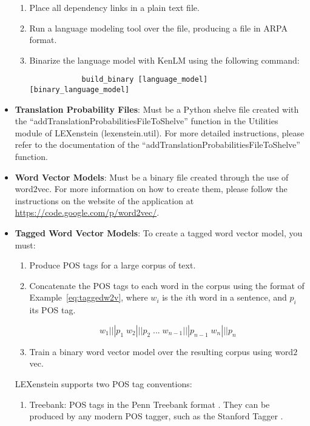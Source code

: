 \begin{itemize}
\begin{enumerate}
			\item Place all dependency links in a plain text file.
			\item Run a language modeling tool over the file, producing a file in ARPA format.
			\item Binarize the language model with KenLM using the following command:
			
			\begin{lstlisting}
			build_binary [language_model] [binary_language_model]
			\end{lstlisting}
		\end{enumerate}
			
	\item \textbf{Translation Probability Files}: Must be a Python shelve file created with the ``addTranslationProbabilitiesFileToShelve'' function in the Utilities module of LEXenstein (lexenstein.util). For more detailed instructions, please refer to the documentation of the ``addTranslationProbabilitiesFileToShelve'' function.
	
	\item \textbf{Word Vector Models}: Must be a binary file created through the use of word$2$vec. For more information on how to create them, please follow the instructions on the website of the application at \url{https://code.google.com/p/word2vec/}.
	
	\item \textbf{Tagged Word Vector Models}: To create a tagged word vector model, you must:
	
		\begin{enumerate}
			\item Produce POS tags for a large corpus of text.
			\item Concatenate the POS tags to each word in the corpus using the format of Example~\ref{eq:taggedw2v}, where $w_{i}$ is the $i$th word in a sentence, and $p_{i}$ its POS tag.
			
			\begin{equation}
				\label{eq:taggedw2v}
				w_{1}|||p_{1}\; w_{2}|||p_{2}\;  ...\; w_{n-1}|||p_{n-1}\; w_{n}|||p_{n}
				\end{equation}
				
			\item Train a binary word vector model over the resulting corpus using word$2$vec.
		\end{enumerate}
		
		LEXenstein supports two POS tag conventions:
		
			\begin{enumerate}
				\item Treebank: POS tags in the Penn Treebank format \cite{Marcus1993}. They can be produced by any modern POS tagger, such as the Stanford Tagger \cite{stanfordparser}.
				

\end{enumerate}
\end{itemize}
